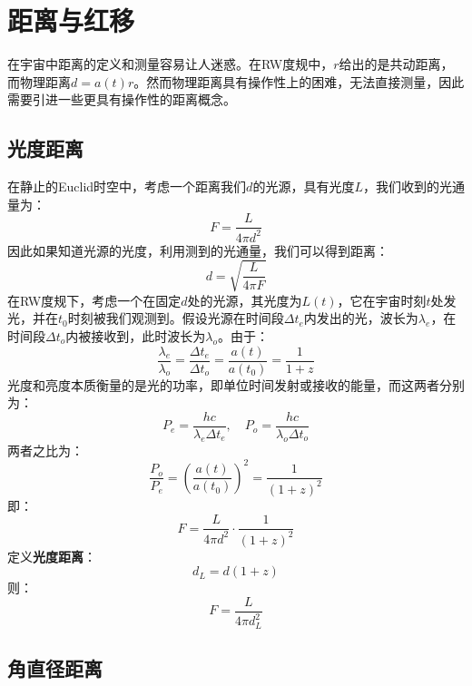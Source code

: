 \documentclass[fontset=none,openany,a4paper]{ctexbook}
\begin{document}
\chapter{距离与红移}

在宇宙中距离的定义和测量容易让人迷惑。在RW度规中，$r$给出的是共动距离，而物理距离$d = a(t)r$。然而物理距离具有操作性上的困难，无法直接测量，因此需要引进一些更具有操作性的距离概念。

\section{光度距离}

在静止的Euclid时空中，考虑一个距离我们$d$的光源，具有光度$L$，我们收到的光通量为：
\begin{equation}
    F = \frac{L}{4\pi d^2}
\end{equation}
因此如果知道光源的光度，利用测到的光通量，我们可以得到距离：
\begin{equation}
    d = \sqrt{\frac{L}{4\pi F}}
\end{equation}
在RW度规下，考虑一个在固定$d$处的光源，其光度为$L(t)$，它在宇宙时刻$t$处发光，并在$t_0$时刻被我们观测到。假设光源在时间段$\Delta t_e$内发出的光，波长为$\lambda_e$，在时间段$\Delta t_o$内被接收到，此时波长为$\lambda_o$。由于：
\begin{equation}
    \frac{\lambda_e}{\lambda_o} = \frac{\Delta t_e}{\Delta t_o} = \frac{a(t)}{a(t_0)} = \frac{1}{1 + z}
\end{equation}
光度和亮度本质衡量的是光的功率，即单位时间发射或接收的能量，而这两者分别为：
\begin{equation}
    P_e = \frac{hc}{\lambda_e\Delta t_e},\quad P_o = \frac{hc}{\lambda_o\Delta t_o}
\end{equation}
两者之比为：
\begin{equation}
    \frac{P_o}{P_e} = \left(\frac{a(t)}{a(t_0)}\right)^2 = \frac{1}{(1 + z)^2}
\end{equation}
即：
\begin{equation}
    F = \frac{L}{4\pi d^2} \cdot \frac{1}{(1 + z)^2}
\end{equation}
定义\textbf{光度距离}：
\begin{equation}
    d_L = d(1 + z)
\end{equation}
则：
\begin{equation}
    F = \frac{L}{4\pi d_L^2}
\end{equation}

\section{角直径距离}
\end{document}
